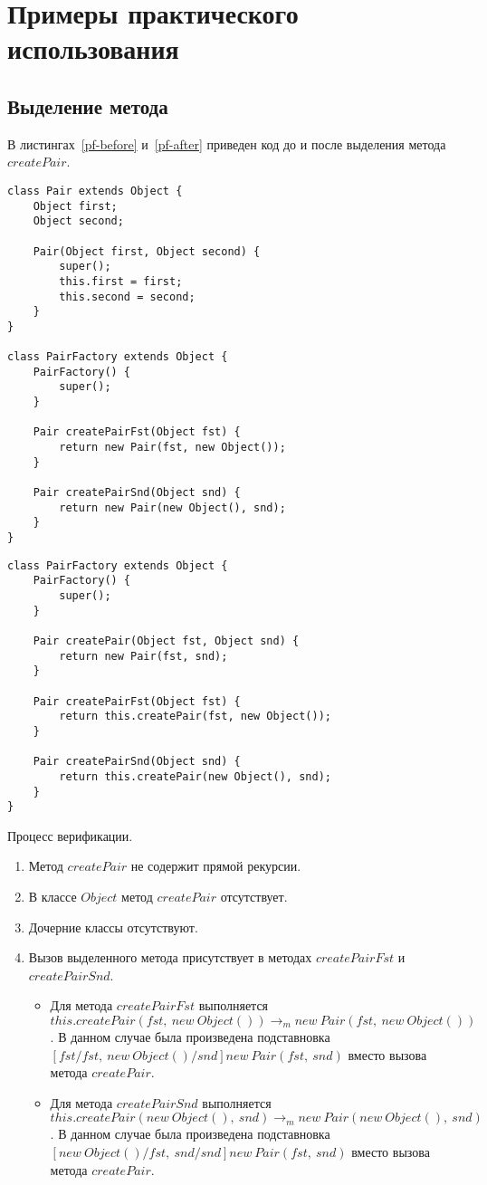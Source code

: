 \chapter{Примеры практического использования}

\section{Выделение метода}
В листингах~\ref{pf-before} и~\ref{pf-after} приведен код до и после выделения метода $createPair$.
\begin{lstlisting}[float=ht,label=pf-before,caption=Код до выделения метода]
class Pair extends Object {
    Object first;
    Object second;

    Pair(Object first, Object second) {
        super();
        this.first = first;
        this.second = second;
    }
}

class PairFactory extends Object {
    PairFactory() {
        super();
    }

    Pair createPairFst(Object fst) {
        return new Pair(fst, new Object());
    }

    Pair createPairSnd(Object snd) {
        return new Pair(new Object(), snd);
    }
}
\end{lstlisting}

\begin{lstlisting}[float=ht,label=pf-after,caption=Код после выделения метода]
class PairFactory extends Object {
    PairFactory() {
        super();
    }

    Pair createPair(Object fst, Object snd) {
    	return new Pair(fst, snd);
    }

    Pair createPairFst(Object fst) {
        return this.createPair(fst, new Object());
    }

    Pair createPairSnd(Object snd) {
        return this.createPair(new Object(), snd);
    }
}
\end{lstlisting}


Процесс верификации.
\begin{enumerate}
    \item Метод $createPair$ не содержит прямой рекурсии.
    \item В классе $Object$ метод $createPair$ отсутствует.
    \item Дочерние классы отсутствуют.
    \item Вызов выделенного метода присутствует в методах $createPairFst$ и $createPairSnd$.
    \begin{itemize}
        \item Для метода $createPairFst$ выполняется $this.createPair(fst,\ new\ Object()) \rightarrow_m new\ Pair(fst,\ new\ Object())$.
        В данном случае была произведена подставновка $[fst/fst,\ new\ Object()/snd]new\ Pair(fst,\ snd)$ вместо вызова метода $createPair$.
        \item Для метода $createPairSnd$ выполняется $this.createPair(new\ Object(),\ snd) \rightarrow_m new\ Pair(new\ Object(),\ snd)$.
        В данном случае была произведена подставновка $[new\ Object()/fst,\ snd/snd]new\ Pair(fst,\ snd)$ вместо вызова метода $createPair$.
    \end{itemize}
\end{enumerate}

